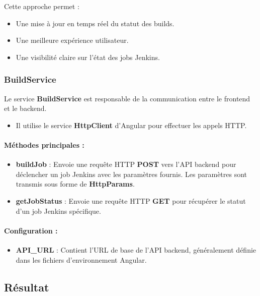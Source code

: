 Cette approche permet :
\begin{itemize}
    \item Une mise à jour en temps réel du statut des builds.
    \item Une meilleure expérience utilisateur.
    \item Une visibilité claire sur l’état des jobs Jenkins.
\end{itemize}

\subsubsection*{BuildService}

Le service \textbf{BuildService} est responsable de la communication entre le frontend et le backend.

\begin{itemize}
    \item Il utilise le service \textbf{HttpClient} d’Angular pour effectuer les appels HTTP.
\end{itemize}

\paragraph{Méthodes principales :}

\begin{itemize}
    \item \textbf{buildJob} :  
    Envoie une requête HTTP \textbf{POST} vers l’API backend pour déclencher un job Jenkins avec les paramètres fournis.  
    Les paramètres sont transmis sous forme de \textbf{HttpParams}.

    \item \textbf{getJobStatus} :  
    Envoie une requête HTTP \textbf{GET} pour récupérer le statut d’un job Jenkins spécifique.
\end{itemize}

\paragraph{Configuration :}

\begin{itemize}
    \item \textbf{API\_URL} :  
    Contient l’URL de base de l’API backend, généralement définie dans les fichiers d’environnement Angular.
\end{itemize}
\subsection*{Résultat}

